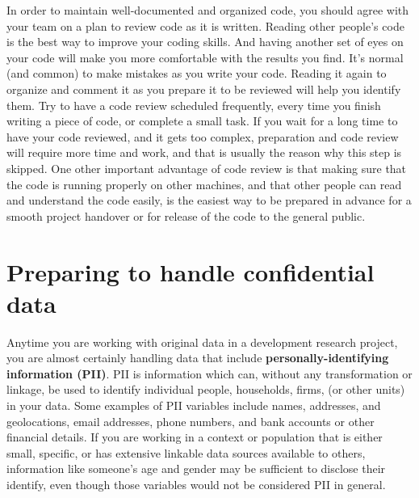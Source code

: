 In order to maintain well-documented and organized code,
you should agree with your team on a plan to review code as it is written.
Reading other people's code is the best way to improve your coding skills.
And having another set of eyes on your code will make you more comfortable with the results you find.
It's normal (and common) to make mistakes as you write your code.
Reading it again to organize and comment it as you prepare it to be reviewed will help you identify them.
Try to have a code review scheduled frequently,
every time you finish writing a piece of code, or complete a small task.
If you wait for a long time to have your code reviewed, and it gets too complex,
preparation and code review will require more time and work,
and that is usually the reason why this step is skipped.
One other important advantage of code review is that
making sure that the code is running properly on other machines,
and that other people can read and understand the code easily,
is the easiest way to be prepared in advance for a smooth project handover
or for release of the code to the general public.


\section{Preparing to handle confidential data}

Anytime you are working with original data in a development research project,
you are almost certainly handling data that include
\textbf{personally-identifying information (PII)}.
PII is information which can, without any transformation or linkage,
be used to identify individual people, households, firms,
(or other units) in your data.
Some examples of PII variables include names, addresses, and geolocations,
email addresses, phone numbers,
and bank accounts or other financial details.
If you are working in a context or population that is either small, specific,
or has extensive linkable data sources available to others,
information like someone's age and gender may be sufficient to
disclose their identify, even though those variables would not be considered PII in general.

